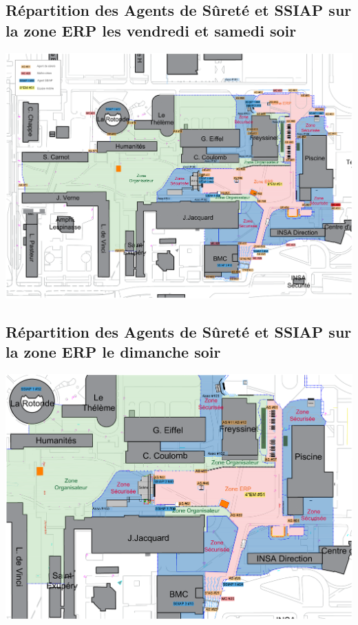 \documentclass[hidelinks, paper=a4, fontsize=13pt]{report}
\begin{document}
\subsection{Répartition des Agents de Sûreté et SSIAP sur la zone ERP les vendredi et samedi soir}
\label{refRepartitionAgentsDeSurete}
\begin{center}
	\includegraphics[width=\textwidth,keepaspectratio, angle=90]{Exports/Plan_24h_44eme-AS_Nuit}
\end{center}

\subsection{Répartition des Agents de Sûreté et SSIAP sur la zone ERP le dimanche soir}
\label{refRepartitionAgentsDeSureteDimanche}
\begin{center}
	\includegraphics[width=\textwidth,keepaspectratio, angle=90]{Exports/Plan_24h_44eme-AS_Dimanche}
\end{center}
\end{document}
